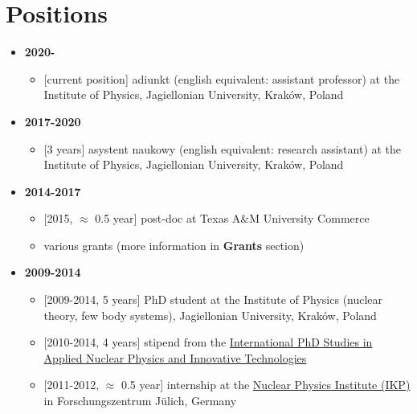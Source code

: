 \documentclass{article}
\providecommand{\tightlist}{%
  \setlength{\itemsep}{0pt}\setlength{\parskip}{0pt}}
\begin{document}
\hypertarget{positions}{%
\section*{Positions}\label{positions}}

\begin{itemize}
\tightlist
\item
  \textbf{2020-}

  \begin{itemize}
  \tightlist
  \item
    {[}current position{]} adiunkt (english equivalent: assistant
    professor) at the Institute of Physics, Jagiellonian University,
    Kraków, Poland
  \end{itemize}
\item
  \textbf{2017-2020}

  \begin{itemize}
  \tightlist
  \item
    {[}3 years{]} asystent naukowy (english equivalent: research
    assistant) at the Institute of Physics, Jagiellonian University,
    Kraków, Poland
  \end{itemize}
\item
  \textbf{2014-2017}

  \begin{itemize}
  \tightlist
  \item
    {[}2015, \(\approx\) 0.5 year{]} post-doc at Texas A\&M University
    Commerce
  \item
    various grants (more information in \textbf{Grants} section)
  \end{itemize}
\item
  \textbf{2009-2014}

  \begin{itemize}
  \tightlist
  \item
    {[}2009-2014, 5 years{]} PhD student at the Institute of Physics
    (nuclear theory, few body systems), Jagiellonian University, Kraków,
    Poland
  \item
    {[}2010-2014, 4 years{]} stipend from the
    \href{https://fais.uj.edu.pl/applied-nuclear-physics-and-innovative-technologies}{International
    PhD Studies in Applied Nuclear Physics and Innovative Technologies}
  \item
    {[}2011-2012, \(\approx\) 0.5 year{]} internship at the
    \href{https://www.fz-juelich.de/ikp/EN/Home/home_node.html}{Nuclear
    Physics Institute (IKP)} in Forschungszentrum Jülich, Germany
  \end{itemize}
\end{itemize}
\end{document}

